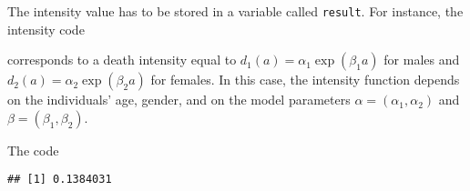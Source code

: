 The intensity value has to be stored in a variable called \texttt{result}. For instance, the intensity code

\begin{Shaded}
\begin{Highlighting}[]
\end{Highlighting}
\end{Shaded}

corresponds to a death intensity equal to \(d_1(a) = \alpha_1 \exp(\beta_1 a)\) for males and \(d_2(a) = \alpha_2 \exp(\beta_2 a)\) for females. In this case, the intensity function depends on the individuals' age, gender, and on the model parameters \(\alpha = (\alpha_1, \alpha_2)\) and \(\beta = (\beta_1, \beta_2)\).

The code

\begin{Shaded}
\begin{Highlighting}[]
\StringTok{ }\NormalTok{(}\NormalTok{(}\NormalTok{),}
                                  \NormalTok{(}\NormalTok{(}\NormalTok{,}\NormalTok{), }
                                       \NormalTok{(}\NormalTok{,}\NormalTok{)))}
\NormalTok{(}\NormalTok{,}\NormalTok{) }
\end{Highlighting}
\end{Shaded}

\begin{verbatim}
## [1] 0.1384031
\end{verbatim}

\begin{Shaded}
\begin{Highlighting}[]
\StringTok{ }\NormalTok{(}\NormalTok{=}\StringTok{ }

\end{Highlighting}
\end{Shaded}

